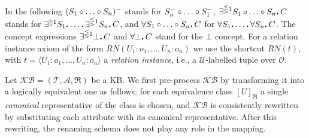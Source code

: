 \documentclass[draft]{article}
\newcommand{\Int}[1]{#1^{\Imc}\xspace}
\newcommand{\KB}{\ensuremath{\mathcal{KB}}\xspace}
\newcommand{\per}{\mathpunct{\mbox{\bf .}}}
\newcommand{\A}{\ensuremath{\mathcal{A}}\xspace}
\newcommand{\Ob}{\ensuremath{\mathcal{O}}\xspace}
\begin{document}

In the following $(S_1\circ\ldots\circ S_n)^-$ stands for $S_n^-\circ\ldots\circ S_1^-$, $\exists^{\lesseqgtr 1} S_1\chain\ldots\chain S_n\per C$ stands for $\card{1}{S_1\per\ldots\per\exists^{\lesseqgtr 1} S_n}{C}$, and $\forall S_1\chain\ldots\chain S_n\per C$ for $\forall S_1\per\ldots\per\forall S_n\per {C}$. The concept expressions $\exists^{\lesseqgtr 1}\bot\per{C}$ and $\forall \bot\per {C}$ stand for the $\bot$ concept.
%
%
For a relation instance axiom %
of the form
$R\!N(U_1\!:\!o_1,\ldots,U_n\!:\!o_n)$ we use the shortcut $R\!N(t)$,
with $t = \langle U_1\!:\!o_1,\ldots,U_n\!:\!o_n\rangle$ a
\emph{relation instance}, i.e., a $\mathcal{U}$-labelled tuple over $\Ob$.

Let $\KB = (\mathcal{T},\A,\Re)$ be a \DLRpm KB.
We first pre-process \KB by transforming it into a logically equivalent one as follows: for each equivalence class 
$[U]_{\Re}$ a single \emph{canonical} representative of the class is chosen, and \KB is consistently rewritten by 
substituting each attribute with its canonical representative. 
After this rewriting, the renaming schema does not play any role in the mapping.
\end{document}
